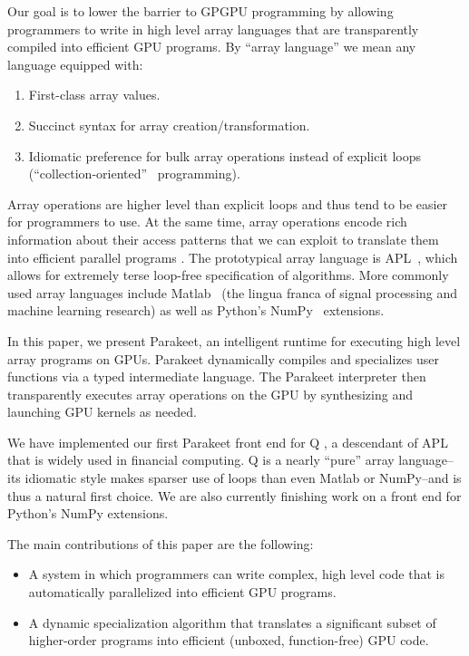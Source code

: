 \documentclass[preprint]{sigplanconf}
\begin{document}
Our goal is to lower the barrier to GPGPU programming by allowing programmers to
write in high level array languages that are transparently compiled into
efficient GPU programs. By ``array language'' we mean any language equipped
with:
\begin{enumerate}
\item First-class array values.
\item Succinct syntax for array creation/transformation.
\item Idiomatic preference for bulk array operations instead of explicit loops
(``collection-oriented''~\cite{Sip91} programming).
\end{enumerate}

Array operations are higher level than explicit loops and thus tend
to be easier for programmers to use. At the same time, array operations encode
rich information about their access patterns that we can exploit to translate
them into efficient parallel programs \cite{Ju94}. The prototypical array
language is APL~\cite{Iverson62}, which allows for extremely terse loop-free
specification of algorithms. More commonly used array languages include
Matlab~\cite{Moler80} (the lingua franca of signal processing and machine
learning research) as well as Python's NumPy~\cite{Oliphant07} extensions.

In this paper, we present Parakeet, an intelligent runtime for executing high
level array programs on GPUs. Parakeet dynamically compiles and specializes user
functions via a typed intermediate language.  The Parakeet interpreter then
transparently executes array operations on the GPU by synthesizing and launching
GPU kernels as needed.

We have implemented our first Parakeet front end for Q \cite{Borr08}, a
descendant of APL that is widely used in financial computing. 
Q is a nearly ``pure'' array language--its idiomatic style makes sparser use of
loops than even Matlab or NumPy--and is thus a natural first choice.
We are also currently finishing work on a front end for Python's NumPy extensions.

The main contributions of this paper are the following:

\begin{itemize}
\item A system in which programmers can write complex, high level code
that is automatically parallelized into efficient GPU programs.

\item A dynamic specialization algorithm that translates a significant subset of
higher-order programs into efficient (unboxed, function-free) GPU code.
\end{itemize}
\end{document}
